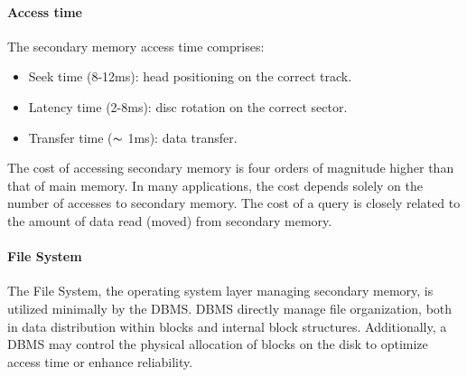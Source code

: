 \paragraph*{Access time} 
The secondary memory access time comprises:
\begin{itemize}
    \item Seek time (8-12ms): head positioning on the correct track. 
    \item Latency time (2-8ms): disc rotation on the correct sector. 
    \item Transfer time ($\thicksim$ 1ms): data transfer.
\end{itemize}
The cost of accessing secondary memory is four orders of magnitude higher than that of main memory.
In many applications, the cost depends solely on the number of accesses to secondary memory.
The cost of a query is closely related to the amount of data read (moved) from secondary memory.

\paragraph*{File System} 
The File System, the operating system layer managing secondary memory, is utilized minimally by the DBMS.
DBMS directly manage file organization, both in data distribution within blocks and internal block structures. 
Additionally, a DBMS may control the physical allocation of blocks on the disk to optimize access time or enhance reliability.